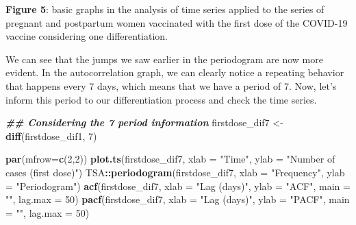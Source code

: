 \documentclass[
]{article}
\newenvironment{Shaded}{\begin{snugshade}}{\end{snugshade}}
\newcommand{\AttributeTok}[1]{\textcolor[rgb]{0.13,0.29,0.53}{#1}}
\newcommand{\DecValTok}[1]{\textcolor[rgb]{0.00,0.00,0.81}{#1}}
\newcommand{\DocumentationTok}[1]{\textcolor[rgb]{0.56,0.35,0.01}{\textbf{\textit{#1}}}}
\newcommand{\FunctionTok}[1]{\textcolor[rgb]{0.13,0.29,0.53}{\textbf{#1}}}
\newcommand{\NormalTok}[1]{#1}
\newcommand{\OtherTok}[1]{\textcolor[rgb]{0.56,0.35,0.01}{#1}}
\newcommand{\SpecialCharTok}[1]{\textcolor[rgb]{0.81,0.36,0.00}{\textbf{#1}}}
\newcommand{\StringTok}[1]{\textcolor[rgb]{0.31,0.60,0.02}{#1}}
\renewenvironment{Shaded}{\begin{mdframed}[ backgroundcolor=shadecolor, linecolor = shadecolor, leftmargin=\dimexpr\leftmargin-2pt\relax, innerleftmargin=1.6pt, innertopmargin=5pt, skipabove=10pt,skipbelow=3pt ]}{\end{mdframed}}
\begin{document}
\textbf{Figure 5}: basic graphs in the analysis of time series applied
to the series of pregnant and postpartum women vaccinated with the first
dose of the COVID-19 vaccine considering one differentiation.

We can see that the jumps we saw earlier in the periodogram are now more
evident. In the autocorrelation graph, we can clearly notice a repeating
behavior that happens every 7 days, which means that we have a period of
7. Now, let's inform this period to our differentiation process and
check the time series.

\begin{Shaded}
\begin{Highlighting}[]
\DocumentationTok{\#\# Considering the 7 period information}
\NormalTok{firstdose\_dif7 }\OtherTok{\textless{}{-}} \FunctionTok{diff}\NormalTok{(firstdose\_dif1, }\DecValTok{7}\NormalTok{)}

\FunctionTok{par}\NormalTok{(}\AttributeTok{mfrow=}\FunctionTok{c}\NormalTok{(}\DecValTok{2}\NormalTok{,}\DecValTok{2}\NormalTok{))}
\FunctionTok{plot.ts}\NormalTok{(firstdose\_dif7, }
        \AttributeTok{xlab =} \StringTok{"Time"}\NormalTok{,}
        \AttributeTok{ylab =} \StringTok{"Number of cases (first dose)"}\NormalTok{)}
\NormalTok{TSA}\SpecialCharTok{::}\FunctionTok{periodogram}\NormalTok{(firstdose\_dif7, }
                 \AttributeTok{xlab =} \StringTok{"Frequency"}\NormalTok{,}
                 \AttributeTok{ylab =} \StringTok{"Periodogram"}\NormalTok{)}
\FunctionTok{acf}\NormalTok{(firstdose\_dif7, }
    \AttributeTok{xlab =} \StringTok{"Lag (days)"}\NormalTok{,}
    \AttributeTok{ylab =} \StringTok{"ACF"}\NormalTok{,}
    \AttributeTok{main =} \StringTok{""}\NormalTok{,}
    \AttributeTok{lag.max =} \DecValTok{50}\NormalTok{)}
\FunctionTok{pacf}\NormalTok{(firstdose\_dif7, }
     \AttributeTok{xlab =} \StringTok{"Lag (days)"}\NormalTok{,}
     \AttributeTok{ylab =} \StringTok{"PACF"}\NormalTok{,}
     \AttributeTok{main =} \StringTok{""}\NormalTok{,}
     \AttributeTok{lag.max =} \DecValTok{50}\NormalTok{)}
\end{Highlighting}
\end{Shaded}
\end{document}
